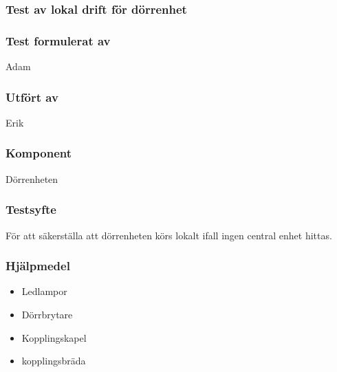 \clearpage
\subsubsection{Test av lokal drift för dörrenhet}
\label{test:localDrift}

\setlength{\columnsep}{1cm}




\begin{multicols}{2}
\subsubsection*{Test formulerat av}
Adam

\subsubsection*{Utfört av}
Erik


\end{multicols}
\subsubsection*{Komponent}
Dörrenheten


\subsubsection*{Testsyfte}
För att säkerställa att dörrenheten körs lokalt ifall ingen central enhet hittas.


\subsubsection*{Hjälpmedel}
\begin{itemize}
	\item Ledlampor
	\item Dörrbrytare
	\item Kopplingskapel
	\item kopplingsbräda
\end{itemize}



